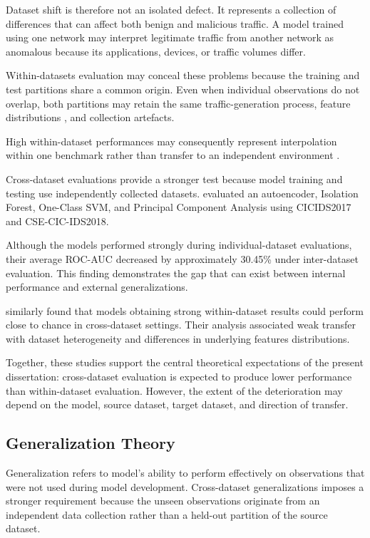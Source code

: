 Dataset shift is therefore not an isolated defect. It represents a collection of differences that can affect both benign and malicious traffic. A model trained using one network may interpret legitimate traffic from another network as anomalous because  its applications, devices, or traffic volumes differ.

Within-datasets evaluation may conceal these problems because the training and test partitions share a common origin. Even when individual observations do not overlap, both partitions may retain the same traffic-generation process, feature distributions , and collection artefacts.

High within-dataset performances may consequently represent interpolation within one benchmark rather than transfer to an independent environment \cite{Kenyon2020, Goldschmidt2025}.

Cross-dataset evaluations provide a stronger test because model training and testing use independently collected datasets. \cite{Verkerken2022} evaluated an autoencoder, Isolation Forest, One-Class SVM, and Principal Component Analysis using CICIDS2017 and CSE-CIC-IDS2018. 

Although the models performed strongly during individual-dataset evaluations, their average ROC-AUC decreased by approximately 30.45\%  under inter-dataset evaluation. This finding demonstrates the gap that can exist between internal performance and external generalizations.

\cite{Cantone2024} similarly found that models obtaining strong within-dataset results could perform close to chance in cross-dataset settings. Their analysis associated weak transfer with dataset heterogeneity and differences in underlying features distributions.

Together, these studies support the central theoretical expectations of the present dissertation: cross-dataset evaluation is expected  to produce lower performance than within-dataset evaluation. However, the extent of the deterioration may depend on the model, source dataset, target dataset, and direction of transfer.

\subsection{Generalization Theory}
\label{subsec:generalisation-theory}

Generalization refers to model's ability to perform effectively on observations that were not used during model development. Cross-dataset 
generalizations imposes a stronger requirement because the unseen observations originate from an independent data collection rather than a 
held-out partition of the source dataset.

